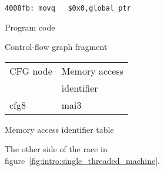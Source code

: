 \begin{figure}
  \begin{minipage}{70mm}
    \begin{subfloat}
      \begin{minipage}{50mm}
\begin{verbatim}
4008fb: movq   $0x0,global_ptr
\end{verbatim}
      \end{minipage}
      \caption{Program code}
    \end{subfloat}
    \vspace{50pt}
    \begin{subfloat}
      \hspace{20mm}
      \caption{Control-flow graph fragment}
    \end{subfloat}
    \begin{subfloat}
      \begin{tabular}{ll}
        CFG node & Memory access \\
                 & identifier \\
        cfg8     & mai3 \\
      \end{tabular}
      \caption{Memory access identifier table}
    \end{subfloat}
  \end{minipage}
  \begin{subfloat}
    \begin{minipage}{30mm}
    \end{minipage}
    \caption{\STateMachine}
  \end{subfloat}
  \label{fig:intro:single_threaded_machine_write}
  \caption{The other side of the race in
    figure~\ref{fig:intro:single_threaded_machine}. }
\end{figure}

